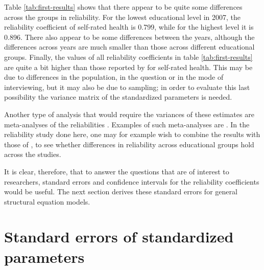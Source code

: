 \documentclass[a4paper,11pt]{article}
\newcommand{\0}{\boldsymbol{0}}
\begin{document}
Table \ref{tab:first-results} shows that there appear to be quite some differences across the groups in reliability. 
For the lowest educational level in 2007, the reliability coefficient of self-rated health is 0.799, while for the highest level it is 0.896.
There also appear to be some differences between the years, although the differences across years are much smaller than those across
different educational groups. Finally, the values of all reliability coefficients in table \ref{tab:first-results} are quite a bit higher than those reported by \cite{lundberg1996assessing} 
for self-rated health. This may be due to differences in the population, in the question or in the mode of interviewing, but it may also be due to sampling; in order to evaluate this last possibility the variance matrix of the standardized parameters is needed. 

Another type of analysis that would require the variances of these estimates are meta-analyses of the reliabilities \citep[261, 271-2]{cooper2009handbook}. Examples of such meta-analyses are 
\cite{andrews_construct_1984,scherpenzeel_validity_1997,saris_estimation_2007,alwin_margins_2007}. In the reliability study done 
here, one may for example wish to combine the results with those of \cite{lundberg1996assessing}, to see whether differences in 
reliability across educational groups hold across the studies.

It is clear, therefore, that to answer the questions that are of interest to  researchers, standard errors and confidence intervals for the 
reliability coefficients would be useful. The next section derives these standard errors for general structural equation models. 

\section{Standard errors of standardized parameters\label{sec:analytics}}
\end{document}
